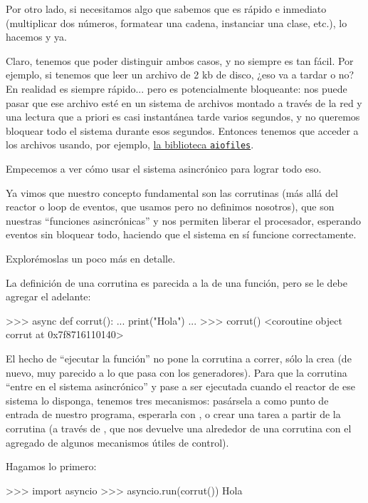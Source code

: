 Por otro lado, si necesitamos algo que sabemos que es rápido e inmediato (multiplicar dos números, formatear una cadena, instanciar una clase, etc.), lo hacemos y ya.

Claro, tenemos que poder distinguir ambos casos, y no siempre es tan fácil. Por ejemplo, si tenemos que leer un archivo de 2 kb de disco, ¿eso va a tardar o no? En realidad es siempre rápido... pero es potencialmente bloqueante: nos puede pasar que ese archivo esté en un sistema de archivos montado a través de la red y una lectura que a priori es casi instantánea tarde varios segundos, y no queremos bloquear todo el sistema durante esos segundos. Entonces tenemos que acceder a los archivos usando, por ejemplo, \href{https://pypi.org/project/aiofiles/}{la biblioteca \texttt{aiofiles}}.

Empecemos a ver cómo usar el sistema asincrónico para lograr todo eso. 

Ya vimos que nuestro concepto fundamental son las corrutinas (más allá del reactor o loop de eventos, que usamos pero no definimos nosotros), que son nuestras ``funciones asincrónicas'' y nos permiten liberar el procesador, esperando eventos sin bloquear todo, haciendo que el sistema en sí funcione correctamente.

Explorémoslas un poco más en detalle. 

La definición de una corrutina es parecida a la de una función, pero se le debe agregar el  adelante:

\begin{py}
>>> async def corrut():
...   print("Hola")
... 
>>> corrut()
<coroutine object corrut at 0x7f8716110140>
\end{py}

El hecho de ``ejecutar la función'' no pone la corrutina a correr, sólo la crea (de nuevo, muy parecido a lo que pasa con los generadores). Para que la corrutina ``entre en el sistema asincrónico'' y pase a ser ejecutada cuando el reactor de ese sistema lo disponga, tenemos tres mecanismos: pasársela a  como punto de entrada de nuestro programa, esperarla con , o crear una tarea a partir de la corrutina (a través de , que nos devuelve una  alrededor de una corrutina con el agregado de algunos mecanismos útiles de control).

Hagamos lo primero:

\begin{py}
>>> import asyncio
>>> asyncio.run(corrut())
Hola
\end{py}

